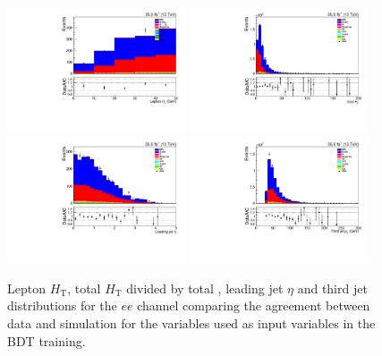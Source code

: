 \begin{figure}[!Htb]
\centering
\includegraphics[width=0.47\textwidth]{figs/background-estimation/plots/unblinded/prompt_ee_ttbarInc/lepHt_NPL_ee_wMass_ee.pdf}
\includegraphics[width=0.47\textwidth]{figs/background-estimation/plots/unblinded/prompt_ee_ttbarInc/totHtOverPt_NPL_ee_wMass_ee.pdf}
\\
\includegraphics[width=0.47\textwidth]{figs/background-estimation/plots/unblinded/prompt_ee_ttbarInc/leadingJetEta_NPL_ee_wMass_ee.pdf}
\includegraphics[width=0.47\textwidth]{figs/background-estimation/plots/unblinded/prompt_ee_ttbarInc/thirdJetPt_NPL_ee_wMass_ee.pdf}
\caption{
Lepton ${\ensuremath{H_{\mathrm{T}}}}$, total ${\ensuremath{H_{\mathrm{T}}}}$ divided by total \pt, leading jet $\eta$ and third jet \pT distributions for the $ee$ channel comparing the agreement between data and simulation for the variables used as input variables in the BDT training.}
\label{fig:inputFeaturesDataSimAgreement3}
\end{figure}

